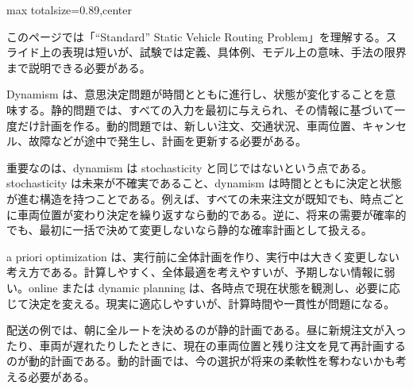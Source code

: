 \begin{minipage}[t]{0.58\textwidth}
\begin{adjustbox}{max totalsize={\textwidth}{0.89\textheight},center}
\begin{minipage}{\textwidth}\scriptsize
{}このページでは「“Standard” Static Vehicle Routing Problem」を理解する。スライド上の表現は短いが、試験では定義、具体例、モデル上の意味、手法の限界まで説明できる必要がある。\par
Dynamism は、意思決定問題が時間とともに進行し、状態が変化することを意味する。静的問題では、すべての入力を最初に与えられ、その情報に基づいて一度だけ計画を作る。動的問題では、新しい注文、交通状況、車両位置、キャンセル、故障などが途中で発生し、計画を更新する必要がある。\par
重要なのは、dynamism は stochasticity と同じではないという点である。stochasticity は未来が不確実であること、dynamism は時間とともに決定と状態が進む構造を持つことである。例えば、すべての未来注文が既知でも、時点ごとに車両位置が変わり決定を繰り返すなら動的である。逆に、将来の需要が確率的でも、最初に一括で決めて変更しないなら静的な確率計画として扱える。\par
a priori optimization は、実行前に全体計画を作り、実行中は大きく変更しない考え方である。計算しやすく、全体最適を考えやすいが、予期しない情報に弱い。online または dynamic planning は、各時点で現在状態を観測し、必要に応じて決定を変える。現実に適応しやすいが、計算時間や一貫性が問題になる。\par
配送の例では、朝に全ルートを決めるのが静的計画である。昼に新規注文が入ったり、車両が遅れたりしたときに、現在の車両位置と残り注文を見て再計画するのが動的計画である。動的計画では、今の選択が将来の柔軟性を奪わないかも考える必要がある。\par

\end{minipage}
\end{adjustbox}
\end{minipage}
